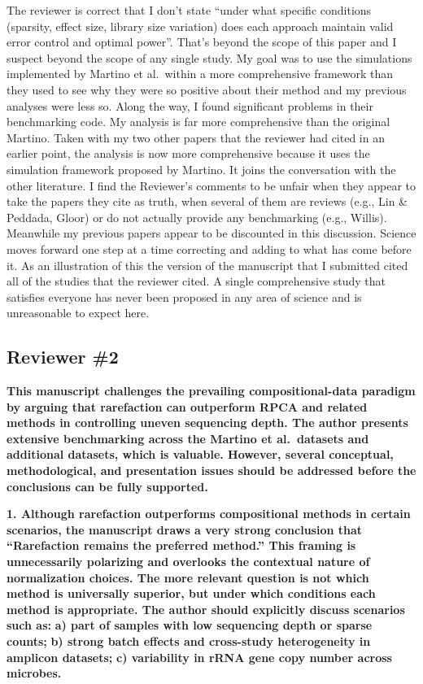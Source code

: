\documentclass[
  11pt,
]{article}
\begin{document}
The reviewer is correct that I don't state ``under what specific
conditions (sparsity, effect size, library size variation) does each
approach maintain valid error control and optimal power''. That's beyond
the scope of this paper and I suspect beyond the scope of any single
study. My goal was to use the simulations implemented by Martino et
al.~within a more comprehensive framework than they used to see why they
were so positive about their method and my previous analyses were less
so. Along the way, I found significant problems in their benchmarking
code. My analysis is far more comprehensive than the original Martino.
Taken with my two other papers that the reviewer had cited in an earlier
point, the analysis is now more comprehensive because it uses the
simulation framework proposed by Martino. It joins the conversation with
the other literature. I find the Reviewer's comments to be unfair when
they appear to take the papers they cite as truth, when several of them
are reviews (e.g., Lin \& Peddada, Gloor) or do not actually provide any
benchmarking (e.g., Willis). Meanwhile my previous papers appear to be
discounted in this discussion. Science moves forward one step at a time
correcting and adding to what has come before it. As an illustration of
this the version of the manuscript that I submitted cited all of the
studies that the reviewer cited. A single comprehensive study that
satisfies everyone has never been proposed in any area of science and is
unreasonable to expect here.

\subsection{Reviewer \#2}\label{reviewer-2}

\textbf{This manuscript challenges the prevailing compositional-data
paradigm by arguing that rarefaction can outperform RPCA and related
methods in controlling uneven sequencing depth. The author presents
extensive benchmarking across the Martino et al.~datasets and additional
datasets, which is valuable. However, several conceptual,
methodological, and presentation issues should be addressed before the
conclusions can be fully supported.}

\textbf{1. Although rarefaction outperforms compositional methods in
certain scenarios, the manuscript draws a very strong conclusion that
``Rarefaction remains the preferred method.'' This framing is
unnecessarily polarizing and overlooks the contextual nature of
normalization choices. The more relevant question is not which method is
universally superior, but under which conditions each method is
appropriate. The author should explicitly discuss scenarios such as:}
\textbf{a) part of samples with low sequencing depth or sparse counts;}
\textbf{b) strong batch effects and cross-study heterogeneity in
amplicon datasets;} \textbf{c) variability in rRNA gene copy number
across microbes.}
\end{document}
